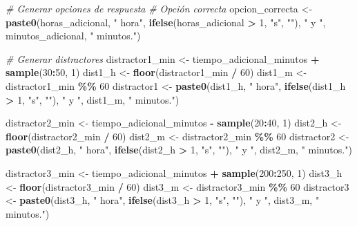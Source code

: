 \documentclass[
]{article}
\newenvironment{Shaded}{\begin{snugshade}}{\end{snugshade}}
\newcommand{\CommentTok}[1]{\textcolor[rgb]{0.56,0.35,0.01}{\textit{#1}}}
\newcommand{\DecValTok}[1]{\textcolor[rgb]{0.00,0.00,0.81}{#1}}
\newcommand{\FunctionTok}[1]{\textcolor[rgb]{0.13,0.29,0.53}{\textbf{#1}}}
\newcommand{\NormalTok}[1]{#1}
\newcommand{\OtherTok}[1]{\textcolor[rgb]{0.56,0.35,0.01}{#1}}
\newcommand{\SpecialCharTok}[1]{\textcolor[rgb]{0.81,0.36,0.00}{\textbf{#1}}}
\newcommand{\StringTok}[1]{\textcolor[rgb]{0.31,0.60,0.02}{#1}}
\begin{document}
\begin{Shaded}
\begin{Highlighting}[]
\CommentTok{\# Generar opciones de respuesta}
\CommentTok{\# Opción correcta}
\NormalTok{opcion\_correcta }\OtherTok{\textless{}{-}} \FunctionTok{paste0}\NormalTok{(horas\_adicional, }\StringTok{" hora"}\NormalTok{, }\FunctionTok{ifelse}\NormalTok{(horas\_adicional }\SpecialCharTok{\textgreater{}} \DecValTok{1}\NormalTok{, }\StringTok{"s"}\NormalTok{, }\StringTok{""}\NormalTok{),}
                          \StringTok{" y "}\NormalTok{, minutos\_adicional, }\StringTok{" minutos."}\NormalTok{)}

\CommentTok{\# Generar distractores}
\NormalTok{distractor1\_min }\OtherTok{\textless{}{-}}\NormalTok{ tiempo\_adicional\_minutos }\SpecialCharTok{+} \FunctionTok{sample}\NormalTok{(}\DecValTok{30}\SpecialCharTok{:}\DecValTok{50}\NormalTok{, }\DecValTok{1}\NormalTok{)}
\NormalTok{dist1\_h }\OtherTok{\textless{}{-}} \FunctionTok{floor}\NormalTok{(distractor1\_min }\SpecialCharTok{/} \DecValTok{60}\NormalTok{)}
\NormalTok{dist1\_m }\OtherTok{\textless{}{-}}\NormalTok{ distractor1\_min }\SpecialCharTok{\%\%} \DecValTok{60}
\NormalTok{distractor1 }\OtherTok{\textless{}{-}} \FunctionTok{paste0}\NormalTok{(dist1\_h, }\StringTok{" hora"}\NormalTok{, }\FunctionTok{ifelse}\NormalTok{(dist1\_h }\SpecialCharTok{\textgreater{}} \DecValTok{1}\NormalTok{, }\StringTok{"s"}\NormalTok{, }\StringTok{""}\NormalTok{),}
                      \StringTok{" y "}\NormalTok{, dist1\_m, }\StringTok{" minutos."}\NormalTok{)}

\NormalTok{distractor2\_min }\OtherTok{\textless{}{-}}\NormalTok{ tiempo\_adicional\_minutos }\SpecialCharTok{{-}} \FunctionTok{sample}\NormalTok{(}\DecValTok{20}\SpecialCharTok{:}\DecValTok{40}\NormalTok{, }\DecValTok{1}\NormalTok{)}
\NormalTok{dist2\_h }\OtherTok{\textless{}{-}} \FunctionTok{floor}\NormalTok{(distractor2\_min }\SpecialCharTok{/} \DecValTok{60}\NormalTok{)}
\NormalTok{dist2\_m }\OtherTok{\textless{}{-}}\NormalTok{ distractor2\_min }\SpecialCharTok{\%\%} \DecValTok{60}
\NormalTok{distractor2 }\OtherTok{\textless{}{-}} \FunctionTok{paste0}\NormalTok{(dist2\_h, }\StringTok{" hora"}\NormalTok{, }\FunctionTok{ifelse}\NormalTok{(dist2\_h }\SpecialCharTok{\textgreater{}} \DecValTok{1}\NormalTok{, }\StringTok{"s"}\NormalTok{, }\StringTok{""}\NormalTok{),}
                      \StringTok{" y "}\NormalTok{, dist2\_m, }\StringTok{" minutos."}\NormalTok{)}

\NormalTok{distractor3\_min }\OtherTok{\textless{}{-}}\NormalTok{ tiempo\_adicional\_minutos }\SpecialCharTok{+} \FunctionTok{sample}\NormalTok{(}\DecValTok{200}\SpecialCharTok{:}\DecValTok{250}\NormalTok{, }\DecValTok{1}\NormalTok{)}
\NormalTok{dist3\_h }\OtherTok{\textless{}{-}} \FunctionTok{floor}\NormalTok{(distractor3\_min }\SpecialCharTok{/} \DecValTok{60}\NormalTok{)}
\NormalTok{dist3\_m }\OtherTok{\textless{}{-}}\NormalTok{ distractor3\_min }\SpecialCharTok{\%\%} \DecValTok{60}
\NormalTok{distractor3 }\OtherTok{\textless{}{-}} \FunctionTok{paste0}\NormalTok{(dist3\_h, }\StringTok{" hora"}\NormalTok{, }\FunctionTok{ifelse}\NormalTok{(dist3\_h }\SpecialCharTok{\textgreater{}} \DecValTok{1}\NormalTok{, }\StringTok{"s"}\NormalTok{, }\StringTok{""}\NormalTok{),}
                      \StringTok{" y "}\NormalTok{, dist3\_m, }\StringTok{" minutos."}\NormalTok{)}


\end{Highlighting}
\end{Shaded}
\end{document}
